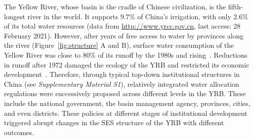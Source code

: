 The Yellow River, whose basin is the cradle of Chinese civilization, is the fifth-longest river in the world. It supports $9.7\%$ of China’s irrigation, with only $2.6\%$ of its total water resources (data from \href{http://www.yrcc.gov.cn}{http://www.yrcc.gov.cn}, last access: 28 February 2021).
However, after years of free access to water by provinces along the river (Figure~\ref{fig:structure} A and B), surface water consumption of the Yellow River was close to $80\%$ of its runoff by the 1980s and rising~\cite{wangYellowRiverwater2019,songSedimenttransportincreasing2020}.
Reductions in runoff after 1972 damaged the ecology of the YRB and restricted its economic development~\cite{wangYellowRiverwater2019}.
Therefore, through typical top-down institutional structures in China (see \textit{Supplementary Material S1}), relatively integrated water allocation regulations were successively proposed across different levels in the YRB.
These include the national government, the basin management agency, provinces, cities, and even districts.
These policies at different stages of institutional development triggered abrupt changes in the SES structure of the YRB with different outcomes.

